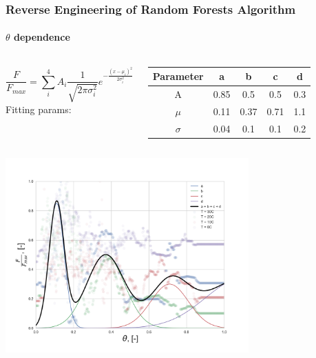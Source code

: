 \documentclass{beamer}
\begin{document}
\begin{frame}
\frametitle{Reverse Engineering of Random Forests Algorithm}
\framesubtitle{$\theta$ dependence}

\begin{columns}[t]
\tiny
{}
\begin{equation}
    \frac{F}{F_{max}} = \sum\limits^{4}_i A_i\frac{1}{\sqrt{2\pi \sigma_i^2}} e^{- \frac{(x - \mu_i)^2}{2\sigma_i^2}}
\end{equation}
\tiny
\centering
Fitting params: \\
\begin{tabular}{|c|c|c|c|c|}
 \hline
 Parameter & a    & b    & c    & d\\ \hline
 A         & 0.85  & 0.5 & 0.5  & 0.3 \\ \hline
 $\mu$     & 0.11 & 0.37 & 0.71 & 1.1 \\ \hline
 $\sigma$  & 0.04 & 0.1 & 0.1  & 0.2 \\ \hline

\end{tabular}

\end{columns}


\centering
\includegraphics[width=0.7\textwidth]{Theta_dependence_fit.png}

\end{frame}
\end{document}
